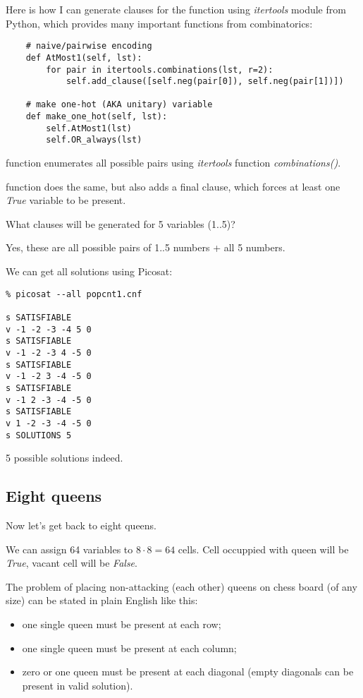 Here is how I can generate clauses for the function using \textit{itertools} module from Python,
which provides many important functions from combinatorics:

\begin{lstlisting}
    # naive/pairwise encoding   
    def AtMost1(self, lst):
        for pair in itertools.combinations(lst, r=2):
            self.add_clause([self.neg(pair[0]), self.neg(pair[1])])
       
    # make one-hot (AKA unitary) variable
    def make_one_hot(self, lst):
        self.AtMost1(lst)
        self.OR_always(lst)
\end{lstlisting}

 function enumerates all possible pairs using \textit{itertools} function
\textit{combinations()}.

 function does the same, but also adds a final clause, which forces at least one
\textit{True} variable to be present.

What clauses will be generated for 5 variables (1..5)?



Yes, these are all possible pairs of 1..5 numbers + all 5 numbers.

We can get all solutions using Picosat:

\begin{lstlisting}
% picosat --all popcnt1.cnf

s SATISFIABLE
v -1 -2 -3 -4 5 0
s SATISFIABLE
v -1 -2 -3 4 -5 0
s SATISFIABLE
v -1 -2 3 -4 -5 0
s SATISFIABLE
v -1 2 -3 -4 -5 0
s SATISFIABLE
v 1 -2 -3 -4 -5 0
s SOLUTIONS 5
\end{lstlisting}

5 possible solutions indeed.

\subsection{Eight queens}

Now let's get back to eight queens.

We can assign 64 variables to $8 \cdot 8=64$ cells.
Cell occuppied with queen will be \textit{True}, vacant cell will be \textit{False}.

The problem of placing non-attacking (each other) queens on chess board (of any size) can be stated in plain English like this:
\begin{itemize}
\item one single queen must be present at each row;

\item one single queen must be present at each column;

\item zero or one queen must be present at each diagonal (empty diagonals can be present in valid solution).
\end{itemize}

